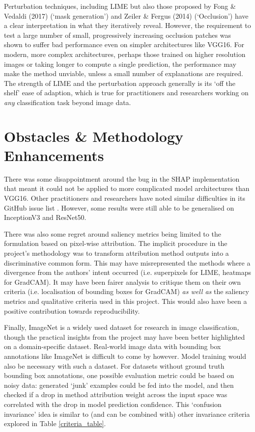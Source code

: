 \documentclass[main]{subfiles}
\begin{document}
Perturbation techniques, including LIME but also those proposed by Fong \& Vedaldi (2017) \cite{perturb_fong} (`mask generation') and Zeiler \& Fergus (2014) \cite{zeilerfergus2013} (`Occlusion') have a clear interpretation in what they iteratively reveal. However, the requirement to test a large number of small, progressively increasing occlusion patches was shown to suffer bad performance even on simpler architectures like VGG16. For modern, more complex architectures, perhaps those trained on higher resolution images or taking longer to compute a single prediction, the performance may make the method unviable, unless a small number of explanations are required. The strength of LIME and the perturbation approach generally is its `off the shelf' ease of adaption, which is true for practitioners and researchers working on \textit{any} classification task beyond image data.

\section{Obstacles \& Methodology Enhancements}

There was some disappointment around the bug in the SHAP implementation that meant it could not be applied to more complicated model architectures than VGG16. Other practitioners and researchers have noted similar difficulties in its GitHub issue list \cite{shaprepo}. However, some results were still able to be generalised on InceptionV3 and ResNet50.

There was also some regret around saliency metrics being limited to the formulation based on pixel-wise attribution. The implicit procedure in the project's methodology was to transform attribution method outputs into a discriminative common form. This may have misrepresented the methods where a divergence from the authors' intent occurred (i.e. superpixels for LIME, heatmaps for GradCAM). It may have been fairer analysis to critique them on their own criteria (i.e. localisation of bounding boxes for GradCAM) \textit{as well as} the saliency metrics and qualitative criteria used in this project. This would also have been a positive contribution towards reproducibility.

Finally, ImageNet is a widely used dataset for research in image classification, though the practical insights from the project may have been better highlighted on a domain-specific dataset. Real-world image data with bounding box annotations like ImageNet is difficult to come by however. Model training would also be necessary with such a dataset. For datasets without ground truth bounding box annotations, one possible evaluation metric could be based on noisy data: generated `junk' examples could be fed into the model, and then checked if a drop in method attribution weight across the input space was correlated with the drop in model prediction confidence. This `confusion invariance' idea is similar to (and can be combined with) other invariance criteria explored in Table \ref{criteria_table}.
\end{document}
